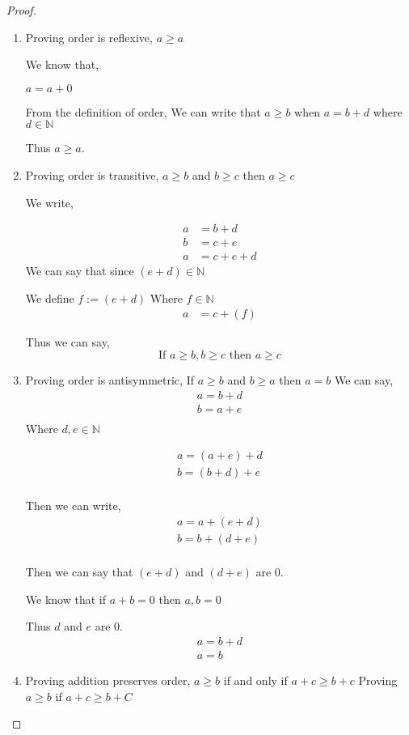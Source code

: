 \documentclass[11pt]{report}
\begin{document}
\begin{proof}
\begin{enumerate}
\item Proving order is reflexive, $a \geq a$

We know that,

$a = a + 0$

From the definition of order,
We can write that $a \geq b$ when $a = b + d$ where $d \in \mathbb{N}$

Thus $a \geq a$.

\item Proving order is transitive, $a \geq b$ and $b \geq c$ then $a \geq c$

We write,

\begin{align*}
a &= b + d \\
b &= c + e \\
a &= c + e + d
\end{align*}
We can say that since $(e+d) \in \mathbb{N}$

We define $f := (e+d)$
Where $f \in \mathbb{N}$
\begin{align*}
a &= c + (f)
\end{align*}

Thus we can say,
$$\text{If } a \geq b, b \geq c \text{ then } a \geq c$$

\item Proving order is antisymmetric, If $a \geq b$ and $b \geq a$ then $a=b$
We can say,
\begin{align*}
a = b + d \\
b = a + e \\
\end{align*}
Where $d,e \in \mathbb{N}$

\begin{align*}
a = (a + e) + d\\
b = (b + d) + e \\
\end{align*}

Then we can write,
\begin{align*}
a = a + (e + d)\\
b = b + (d + e) \\
\end{align*}

Then we can say that $(e+d)$ and $(d+e)$ are 0.

We know that if $a + b = 0$ then $a,b = 0$

Thus $d$ and $e$ are 0.
\begin{align*}
a = b + d \\
a = b
\end{align*}
\item Proving addition preserves order, $a \geq b$ if and only if $a + c \geq b + c$
Proving $a \geq b$ if $a + c \geq b + C$


\end{enumerate}
\end{proof}
\end{document}
